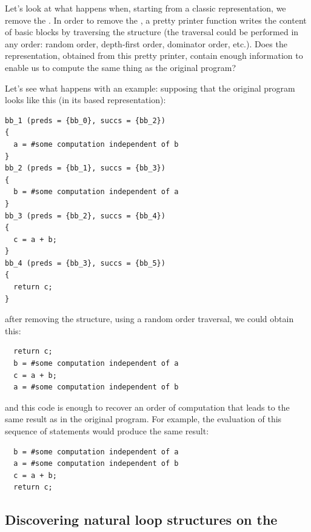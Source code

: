 Let's look at what happens when, starting from a classic \SSA{}
representation, we remove the \CFG{}.  In order to remove the \CFG{},
a pretty printer function writes the content of basic blocks by
traversing the \CFG{} structure (the \CFG{} traversal could be
performed in any order: random order, depth-first order, dominator
order, etc.).  Does the representation, obtained from this pretty
printer, contain enough information to enable us to compute the same
thing as the original program?

Let's see what happens with an example: supposing that the original
program looks like this (in its \CFG{} based \SSA{} representation):
\begin{verbatim}
bb_1 (preds = {bb_0}, succs = {bb_2})
{
  a = #some computation independent of b
}
bb_2 (preds = {bb_1}, succs = {bb_3})
{
  b = #some computation independent of a
}
bb_3 (preds = {bb_2}, succs = {bb_4})
{
  c = a + b;
}
bb_4 (preds = {bb_3}, succs = {bb_5})
{
  return c;
}
\end{verbatim}
after removing the \CFG{} structure, using a random order traversal,
we could obtain this:
\begin{verbatim}
  return c;
  b = #some computation independent of a
  c = a + b;
  a = #some computation independent of b
\end{verbatim}
and this \SSA{} code is enough to recover an order of computation that
leads to the same result as in the original program.  For example, the
evaluation of this sequence of statements would produce the same
result:
\begin{verbatim}
  b = #some computation independent of a
  a = #some computation independent of b
  c = a + b;
  return c;
\end{verbatim}

\subsection{Discovering natural loop structures on the \SSA{}}

